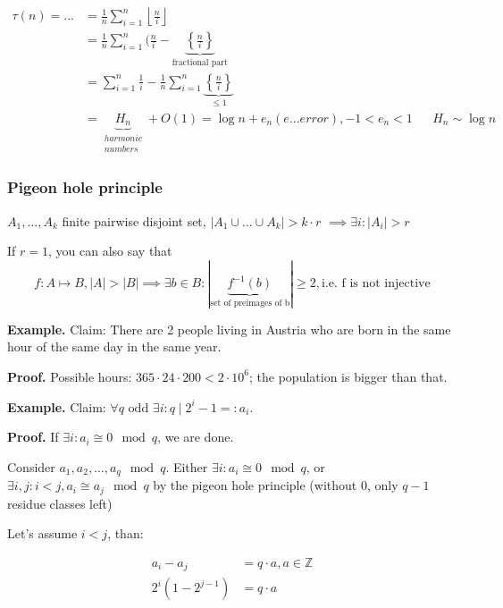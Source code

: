 \begin{align*}
  \tau(n) = ... &=
    \frac{1}{n} \sum_{i=1}^n \left\lfloor\frac{n}{i}\right\rfloor \\
    &= \frac{1}{n} \sum_{i=1}^n (\frac{n}{i} -
        \underbrace{\left\{ \frac ni \right\} }_{\text{fractional part}} \\
    &= \sum_{i=1}^n \frac1i -
        \frac1n\sum_{i=1}^n
            \underbrace{\left\{ \frac ni \right\} }_{≤ 1} \\
    &=  \underbrace{H_n}_{\begin{matrix}harmonic \\ numbers\end{matrix}} + O(1) =
        \log n + e_n (e ... error), -1 < e_n < 1 && H_n\sim \log n
\end{align*}


\subsubsection{Pigeon hole principle}

$A_1, \ldots , A_k$ finite pairwise disjoint set,
$|A_1 \cup \ldots \cup A_k| > k\cdot r$
$\implies \exists i : |A_i| > r$

If $r=1$, you can also say that
\[
  f: A\mapsto B, |A| > |B| \implies \exists b \in B :
  |\underbrace{f^{-1}(b)}_{\text{set of preimages of b}}|
    ≥ 2 ,
    \text{i.e. f is not injective}
\]


\textbf{Example.}
Claim: There are 2 people living in Austria who are born in the same hour of the same day in the same year.

\textbf{Proof.}
Possible hours: $365\cdot 24\cdot 200 < 2\cdot 10^6$;
the population is bigger than that.


\textbf{Example.}
Claim: $\forall q\text{ odd } \exists i: q \mid 2^i-1 =: a_i$.

\textbf{Proof.}
If $\exists i: a_i \cong 0 \mod q$, we are done.

Consider $a_1, a_2,\ldots, a_q \mod q$.
Either $\exists i: a_i \cong 0 \mod q$,
or $\exists i,j: i < j, a_i \cong a_j \mod q$
by the pigeon hole principle (without 0, only $q-1$ residue classes left)

Let's assume $i < j$, than:

\begin{align*}
  a_i - a_j &= q\cdot a, a\in\mathbb{Z} \\
  2^i(1 - 2^{j-1}) &= q\cdot a
\end{align*}


